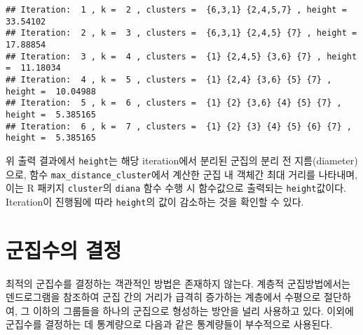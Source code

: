 \documentclass[
]{book}
\newenvironment{Shaded}{\begin{snugshade}}{\end{snugshade}}
\newcommand{\CommentTok}[1]{\textcolor[rgb]{0.56,0.35,0.01}{\textit{#1}}}
\newcommand{\FunctionTok}[1]{\textcolor[rgb]{0.00,0.00,0.00}{#1}}
\newcommand{\NormalTok}[1]{#1}
\newcommand{\OtherTok}[1]{\textcolor[rgb]{0.56,0.35,0.01}{#1}}
\newcommand{\SpecialCharTok}[1]{\textcolor[rgb]{0.00,0.00,0.00}{#1}}
\newcommand{\StringTok}[1]{\textcolor[rgb]{0.31,0.60,0.02}{#1}}
\begin{document}
\begin{Shaded}
\end{Shaded}

\begin{verbatim}
## Iteration:  1 , k =  2 , clusters =  {6,3,1} {2,4,5,7} , height =  33.54102 
## Iteration:  2 , k =  3 , clusters =  {6,3,1} {2,4,5} {7} , height =  17.88854 
## Iteration:  3 , k =  4 , clusters =  {1} {2,4,5} {3,6} {7} , height =  11.18034 
## Iteration:  4 , k =  5 , clusters =  {1} {2,4} {3,6} {5} {7} , height =  10.04988 
## Iteration:  5 , k =  6 , clusters =  {1} {2} {3,6} {4} {5} {7} , height =  5.385165 
## Iteration:  6 , k =  7 , clusters =  {1} {2} {3} {4} {5} {6} {7} , height =  5.385165
\end{verbatim}

위 출력 결과에서 \texttt{height}는 해당 iteration에서 분리된 군집의 분리 전 지름(diameter)으로, 함수 \texttt{max\_distance\_cluster}에서 계산한 군집 내 객체간 최대 거리를 나타내며, 이는 R 패키지 \texttt{cluster}의 \texttt{diana} 함수 수행 시 함수값으로 출력되는 \texttt{height}값이다. Iteration이 진행됨에 따라 \texttt{height}의 값이 감소하는 것을 확인할 수 있다.

\hypertarget{hierarchical-cluster-number}{%
\section{군집수의 결정}\label{hierarchical-cluster-number}}

최적의 군집수를 결정하는 객관적인 방법은 존재하지 않는다. 계층적 군집방법에서는 덴드로그램을 참조하여 군집 간의 거리가 급격히 증가하는 계층에서 수평으로 절단하여, 그 이하의 그룹들을 하나의 군집으로 형성하는 방안을 널리 사용하고 있다. 이외에 군집수를 결정하는 데 통계량으로 다음과 같은 통계량들이 부수적으로 사용된다.
\end{document}
